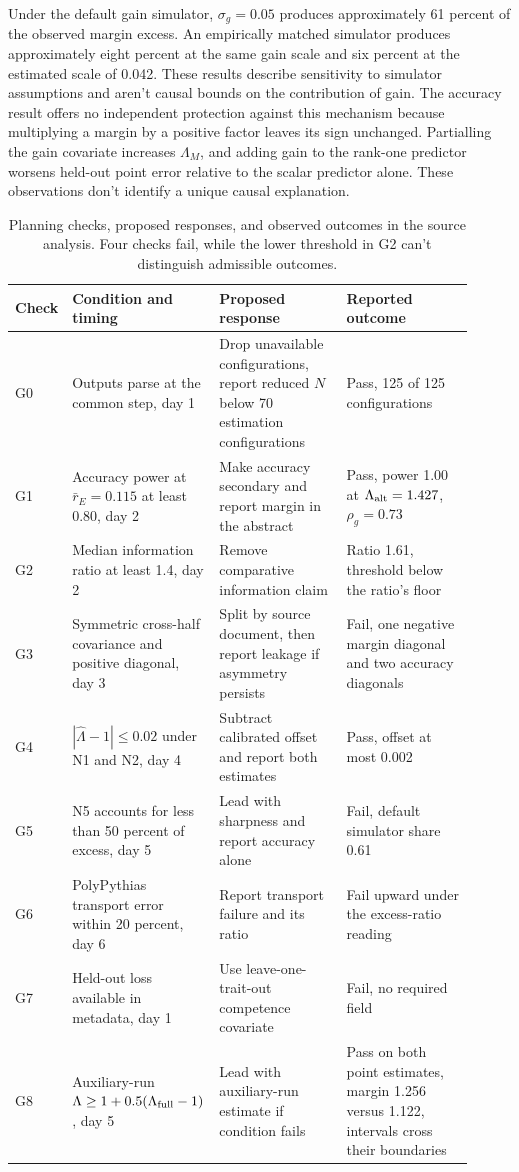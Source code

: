 Under the default gain simulator, $\sigma_g=0.05$ produces approximately 61 percent of the observed margin excess. An empirically matched simulator produces approximately eight percent at the same gain scale and six percent at the estimated scale of 0.042. These results describe sensitivity to simulator assumptions and aren't causal bounds on the contribution of gain. The accuracy result offers no independent protection against this mechanism because multiplying a margin by a positive factor leaves its sign unchanged. Partialling the gain covariate increases $\Lambda_M$, and adding gain to the rank-one predictor worsens held-out point error relative to the scalar predictor alone. These observations don't identify a unique causal explanation.

\begin{table}[htbp]
\centering\scriptsize
\caption{Planning checks, proposed responses, and observed outcomes in the source analysis. Four checks fail, while the lower threshold in G2 can't distinguish admissible outcomes.}
\label{tab:original5}
\begin{tabular}{p{0.04\linewidth}p{0.29\linewidth}p{0.29\linewidth}p{0.29\linewidth}}\hline
Check & Condition and timing & Proposed response & Reported outcome\\\hline
G0 & Outputs parse at the common step, day 1 & Drop unavailable configurations, report reduced $N$ below 70 estimation configurations & Pass, 125 of 125 configurations\\
G1 & Accuracy power at $\bar r_E=0.115$ at least 0.80, day 2 & Make accuracy secondary and report margin in the abstract & Pass, power 1.00 at $\Lambda_{\rm alt}=1.427$, $\rho_g=0.73$\\
G2 & Median information ratio at least 1.4, day 2 & Remove comparative information claim & Ratio 1.61, threshold below the ratio's floor\\
G3 & Symmetric cross-half covariance and positive diagonal, day 3 & Split by source document, then report leakage if asymmetry persists & Fail, one negative margin diagonal and two accuracy diagonals\\
G4 & $|\widehat\Lambda-1|\leq0.02$ under N1 and N2, day 4 & Subtract calibrated offset and report both estimates & Pass, offset at most 0.002\\
G5 & N5 accounts for less than 50 percent of excess, day 5 & Lead with sharpness and report accuracy alone & Fail, default simulator share 0.61\\
G6 & PolyPythias transport error within 20 percent, day 6 & Report transport failure and its ratio & Fail upward under the excess-ratio reading\\
G7 & Held-out loss available in metadata, day 1 & Use leave-one-trait-out competence covariate & Fail, no required field\\
G8 & Auxiliary-run $\Lambda\geq1+0.5(\Lambda_{\rm full}-1)$, day 5 & Lead with auxiliary-run estimate if condition fails & Pass on both point estimates, margin 1.256 versus 1.122, intervals cross their boundaries\\\hline
\end{tabular}
\end{table}

